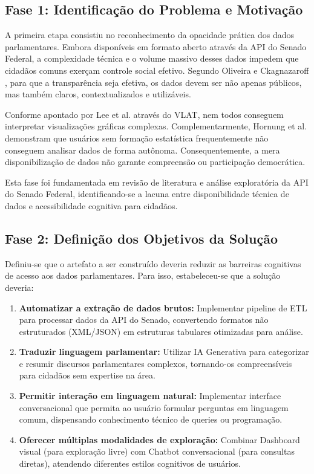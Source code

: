 \subsection{Fase 1: Identificação do Problema e Motivação}

A primeira etapa consistiu no reconhecimento da opacidade prática dos dados parlamentares. Embora disponíveis em formato aberto através da API do Senado Federal, a complexidade técnica e o volume massivo desses dados impedem que cidadãos comuns exerçam controle social efetivo. Segundo Oliveira e Ckagnazaroff \cite{OliveiraCkagnazaroff2022}, para que a transparência seja efetiva, os dados devem ser não apenas públicos, mas também claros, contextualizados e utilizáveis.

Conforme apontado por Lee et al. \cite{Lee2017} através do VLAT, nem todos conseguem interpretar visualizações gráficas complexas. Complementarmente, Hornung et al. \cite{Hornung2015} demonstram que usuários sem formação estatística frequentemente não conseguem analisar dados de forma autônoma. Consequentemente, a mera disponibilização de dados não garante compreensão ou participação democrática.

Esta fase foi fundamentada em revisão de literatura e análise exploratória da API do Senado Federal, identificando-se a lacuna entre disponibilidade técnica de dados e acessibilidade cognitiva para cidadãos.

\subsection{Fase 2: Definição dos Objetivos da Solução}

Definiu-se que o artefato a ser construído deveria reduzir as barreiras cognitivas de acesso aos dados parlamentares. Para isso, estabeleceu-se que a solução deveria:

\begin{enumerate}
    \item \textbf{Automatizar a extração de dados brutos:} Implementar pipeline de ETL para processar dados da API do Senado, convertendo formatos não estruturados (XML/JSON) em estruturas tabulares otimizadas para análise.

    \item \textbf{Traduzir linguagem parlamentar:} Utilizar IA Generativa para categorizar e resumir discursos parlamentares complexos, tornando-os compreensíveis para cidadãos sem expertise na área.

    \item \textbf{Permitir interação em linguagem natural:} Implementar interface conversacional que permita ao usuário formular perguntas em linguagem comum, dispensando conhecimento técnico de queries ou programação.

    \item \textbf{Oferecer múltiplas modalidades de exploração:} Combinar Dashboard visual (para exploração livre) com Chatbot conversacional (para consultas diretas), atendendo diferentes estilos cognitivos de usuários.
\end{enumerate}

